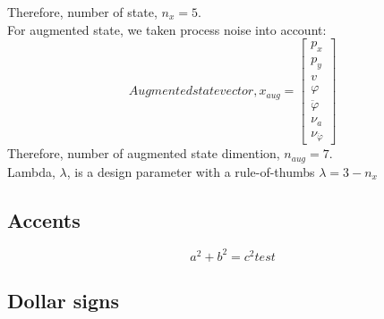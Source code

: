 \documentclass{article}
\begin{document}
Therefore, number of state, $n_x = 5$.\\

For augmented state, we taken process noise into account:\\
\[
Augmented state vector, x_{aug} =
\begin{bmatrix}
p_x \\ p_y \\ v \\ \varphi \\ \ddot{\varphi} \\ \nu_a \\ \nu_{\ddot{\varphi}}
\end{bmatrix}
\]
Therefore, number of augmented state dimention, $n_{aug} = 7$.\\

Lambda, $\lambda$, is a design parameter with a rule-of-thumbs $\lambda = 3 - n_x$


\subsection{Accents}
\begin{equation} 
    a^2 + b^2 = c^2 test
\end{equation}

\subsection{Dollar signs}

    
\end{document}
